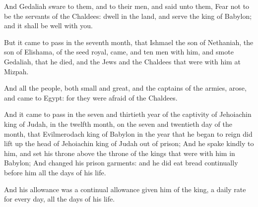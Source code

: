 \verse And Gedaliah sware to them, and to their men, and said unto them, Fear not to be the servants of the Chaldees: dwell in the land, and serve the king of Babylon; and it shall be well with you.

\verse But it came to pass in the seventh month, that Ishmael the son of Nethaniah, the son of Elishama, of the seed royal, came, and ten men with him, and smote Gedaliah, that he died, and the Jews and the Chaldees that were with him at Mizpah.

\verse And all the people, both small and great, and the captains of the armies, arose, and came to Egypt: for they were afraid of the Chaldees.

\verse And it came to pass in the seven and thirtieth year of the captivity of Jehoiachin king of Judah, in the twelfth month, on the seven and twentieth day of the month, that Evilmerodach king of Babylon in the year that he began to reign did lift up the head of Jehoiachin king of Judah out of prison; \verse And he spake kindly to him, and set his throne above the throne of the kings that were with him in Babylon; \verse And changed his prison garments: and he did eat bread continually before him all the days of his life.

\verse And his allowance was a continual allowance given him of the king, a daily rate for every day, all the days of his life.

